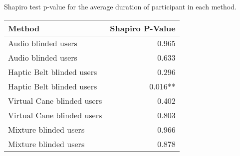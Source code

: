 
\centering
\caption{Shapiro test p-value for the average duration of participant in each method.}
\label{tab:shapiro_duration_avg}
\begin{tabular}{lr}
\toprule
                    Method & Shapiro P-Value \\
\midrule
       Audio blinded users &           0.965 \\
       Audio blinded users &           0.633 \\
 Haptic Belt blinded users &           0.296 \\
 Haptic Belt blinded users &         0.016** \\
Virtual Cane blinded users &           0.402 \\
Virtual Cane blinded users &           0.803 \\
     Mixture blinded users &           0.966 \\
     Mixture blinded users &           0.878 \\
\bottomrule
\end{tabular}
